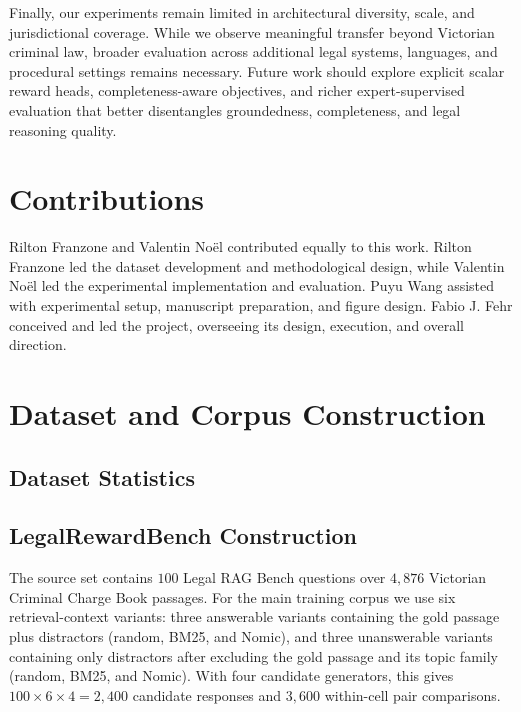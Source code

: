 \documentclass{article}
\theoremstyle{plain}
\theoremstyle{definition}
\theoremstyle{remark}
\begin{document}
Finally, our experiments remain limited in architectural diversity, scale, and jurisdictional coverage. While we observe meaningful transfer beyond Victorian criminal law, broader evaluation across additional legal systems, languages, and procedural settings remains necessary. Future work should explore explicit scalar reward heads, completeness-aware objectives, and richer expert-supervised evaluation that better disentangles groundedness, completeness, and legal reasoning quality.




\appendix



\section*{Contributions}

Rilton Franzone and Valentin Noël contributed equally to this work. Rilton Franzone led the dataset development and methodological design, while Valentin Noël led the experimental implementation and evaluation. Puyu Wang assisted with experimental setup, manuscript preparation, and figure design. Fabio J. Fehr conceived and led the project, overseeing its design, execution, and overall direction.


\section{Dataset and Corpus Construction}
\label{app:dataset-corpus}

\subsection{Dataset Statistics}
\label{app:data-stats}

\subsection*{LegalRewardBench Construction}

The source set contains $100$ Legal RAG Bench questions \citep{butler2026legalragbenchendtoend} over $4{,}876$ Victorian Criminal Charge Book passages.  For the main training corpus we use six retrieval-context variants: three answerable variants containing the gold passage plus distractors (random, BM25, and Nomic), and three unanswerable variants containing only distractors after excluding the gold passage and its topic family (random, BM25, and Nomic).  With four candidate generators, this gives $100 \times 6 \times 4 = 2{,}400$ candidate responses and $3{,}600$ within-cell pair comparisons.
\end{document}
